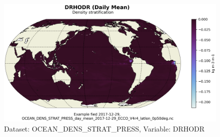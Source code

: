\begin{figure}[H]
\centering
\includegraphics[scale=0.55]{../images/plots/latlon_plots/Ocean_Density_Stratification_and_Hydrostatic_Pressure/DRHODR.png}
\caption{Dataset: OCEAN\_DENS\_STRAT\_PRESS, Variable: DRHODR}
\label{tab:table-OCEAN_DENS_STRAT_PRESS_DRHODR-Plot}
\end{figure}
\pagebreak
